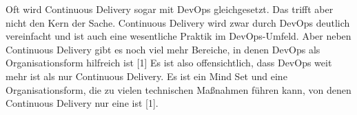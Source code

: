 Oft wird Continuous Delivery sogar mit DevOps gleichgesetzt. Das trifft aber nicht den Kern der Sache. Continuous Delivery wird zwar durch DevOps deutlich vereinfacht und ist auch eine wesentliche Praktik im DevOps-Umfeld. Aber neben Continuous Delivery gibt es noch viel mehr Bereiche, in denen DevOps als Organisationsform hilfreich ist [1]
Es ist also offensichtlich, dass DevOps weit mehr ist als nur Continuous Delivery. Es ist ein Mind Set und eine Organisationsform, die zu vielen technischen Maßnahmen führen kann, von denen Continuous Delivery nur eine ist [1].

